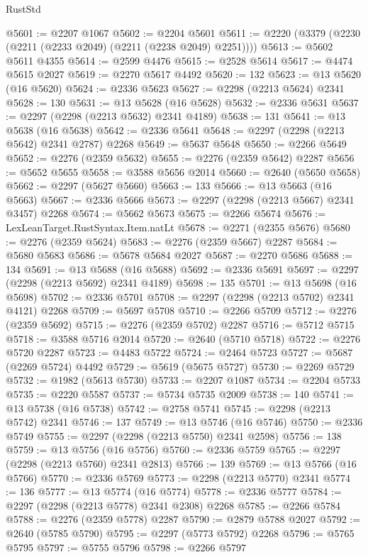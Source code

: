 \begin{lexlean}{RustStd}
\begin{coremodule}
@5601 := @2207 @1067
@5602 := @2204 @5601
@5611 := @2220 (@3379 (@2230 (@2211 (@2233 @2049) (@2211 (@2238 @2049) @2251))))
@5613 := @5602 @5611 @4355
@5614 := @2599 @4476
@5615 := @2528 @5614
@5617 := @4474 @5615 @2027
@5619 := @2270 @5617 @4492
@5620 := 132
@5623 := @13 @5620 (@16 @5620)
@5624 := @2336 @5623
@5627 := @2298 (@2213 @5624) @2341
@5628 := 130
@5631 := @13 @5628 (@16 @5628)
@5632 := @2336 @5631
@5637 := @2297 (@2298 (@2213 @5632) @2341 @4189)
@5638 := 131
@5641 := @13 @5638 (@16 @5638)
@5642 := @2336 @5641
@5648 := @2297 (@2298 (@2213 @5642) @2341 @2787) @2268
@5649 := @5637 @5648
@5650 := @2266 @5649
@5652 := @2276 (@2359 @5632)
@5655 := @2276 (@2359 @5642) @2287
@5656 := @5652 @5655
@5658 := @3588 @5656 @2014
@5660 := @2640 (@5650 @5658)
@5662 := @2297 (@5627 @5660)
@5663 := 133
@5666 := @13 @5663 (@16 @5663)
@5667 := @2336 @5666
@5673 := @2297 (@2298 (@2213 @5667) @2341 @3457) @2268
@5674 := @5662 @5673
@5675 := @2266 @5674
@5676 := LexLeanTarget.RustSyntax.Item.natLt
@5678 := @2271 (@2355 @5676)
@5680 := @2276 (@2359 @5624)
@5683 := @2276 (@2359 @5667) @2287
@5684 := @5680 @5683
@5686 := @5678 @5684 @2027
@5687 := @2270 @5686
@5688 := 134
@5691 := @13 @5688 (@16 @5688)
@5692 := @2336 @5691
@5697 := @2297 (@2298 (@2213 @5692) @2341 @4189)
@5698 := 135
@5701 := @13 @5698 (@16 @5698)
@5702 := @2336 @5701
@5708 := @2297 (@2298 (@2213 @5702) @2341 @4121) @2268
@5709 := @5697 @5708
@5710 := @2266 @5709
@5712 := @2276 (@2359 @5692)
@5715 := @2276 (@2359 @5702) @2287
@5716 := @5712 @5715
@5718 := @3588 @5716 @2014
@5720 := @2640 (@5710 @5718)
@5722 := @2276 @5720 @2287
@5723 := @4483 @5722
@5724 := @2464 @5723
@5727 := @5687 (@2269 @5724) @4492
@5729 := @5619 (@5675 @5727)
@5730 := @2269 @5729
@5732 := @1982 (@5613 @5730)
@5733 := @2207 @1087
@5734 := @2204 @5733
@5735 := @2220 @5587
@5737 := @5734 @5735 @2009
@5738 := 140
@5741 := @13 @5738 (@16 @5738)
@5742 := @2758 @5741
@5745 := @2298 (@2213 @5742) @2341
@5746 := 137
@5749 := @13 @5746 (@16 @5746)
@5750 := @2336 @5749
@5755 := @2297 (@2298 (@2213 @5750) @2341 @2598)
@5756 := 138
@5759 := @13 @5756 (@16 @5756)
@5760 := @2336 @5759
@5765 := @2297 (@2298 (@2213 @5760) @2341 @2813)
@5766 := 139
@5769 := @13 @5766 (@16 @5766)
@5770 := @2336 @5769
@5773 := @2298 (@2213 @5770) @2341
@5774 := 136
@5777 := @13 @5774 (@16 @5774)
@5778 := @2336 @5777
@5784 := @2297 (@2298 (@2213 @5778) @2341 @2308) @2268
@5785 := @2266 @5784
@5788 := @2276 (@2359 @5778) @2287
@5790 := @2879 @5788 @2027
@5792 := @2640 (@5785 @5790)
@5795 := @2297 (@5773 @5792) @2268
@5796 := @5765 @5795
@5797 := @5755 @5796
@5798 := @2266 @5797

\end{coremodule}
\end{lexlean}
